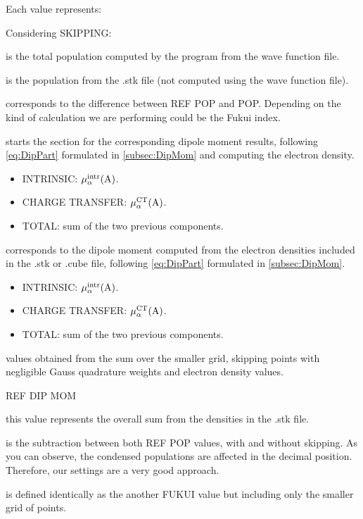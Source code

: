 \documentclass[a4paper,11pt,openany]{memoir}
\begin{document}
Each value represents:
\begin{labeling}{Considering SKIPPING:}
	\item	[POP]					is the total population computed by the program from the wave function file.
	\item	[REF POP]				is the population from the .stk file (not computed using the wave function file).
	\item	[FUKUI]					corresponds to the difference between REF POP and POP. Depending on the kind of calculation we are performing could be the Fukui index.
	\item	[DIP MOM]				starts the section for the corresponding dipole moment results, following \autoref{eq:DipPart} formulated in \autoref{subsec:DipMom} and computing the electron density.
			\begin{itemize}
				\item	INTRINSIC:			$\mu_{\alpha}^{\text{intr}}(\ce{A})$.
				\item 	CHARGE TRANSFER:	$\mu_{\alpha}^{\text{CT}}(\ce{A})$.
				\item 	TOTAL:				sum of the two previous components.
			\end{itemize}
	\item	[REF DIP MOM]			corresponds to the dipole moment computed from the electron densities included in the .stk or .cube file, following \autoref{eq:DipPart} formulated in \autoref{subsec:DipMom}.
			\begin{itemize}
				\item	INTRINSIC:			$\mu_{\alpha}^{\text{intr}}(\ce{A})$.
				\item 	CHARGE TRANSFER:	$\mu_{\alpha}^{\text{CT}}(\ce{A})$.
				\item 	TOTAL:				sum of the two previous components.
			\end{itemize}
	\item	[Considering SKIPPING:]	values obtained from the sum over the smaller grid, skipping points with negligible Gauss quadrature weights and electron density values.
			\begin{labeling}{REF DIP MOM}
				\item 	[REF POP]		this value represents the overall sum from the densities in the .stk file.
				\item 	[DIF REF POP]	is the subtraction between both REF POP values, with and without skipping. As you can observe, the condensed populations are affected in the  decimal position. Therefore, our settings are a very good approach.
				\item 	[FUKUI]			is defined identically as the another FUKUI value but including only the smaller grid of points.

\end{labeling}
\end{labeling}
\end{document}
